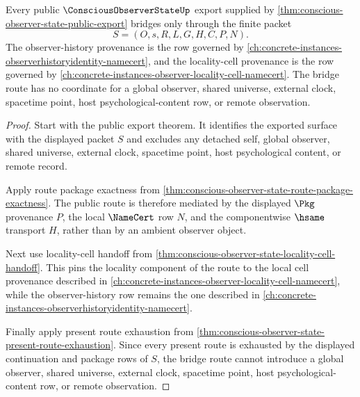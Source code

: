 \begin{theorem}
\label{thm:conscious-observer-state-bridge-route}
Every public $\ConsciousObserverStateUp$ export supplied by \autoref{thm:conscious-observer-state-public-export} bridges only through the finite packet
$$
S=(O,s,R,L,G,H,C,P,N).
$$
The observer-history provenance is the row governed by \autoref{ch:concrete-instances-observerhistoryidentity-namecert}, and the locality-cell provenance is the row governed by \autoref{ch:concrete-instances-observer-locality-cell-namecert}. The bridge route has no coordinate for a global observer, shared universe, external clock, spacetime point, host psychological-content row, or remote observation.
\end{theorem}
\begin{proof}
Start with the public export theorem. It identifies the exported surface with the displayed packet $S$ and excludes any detached self, global observer, shared universe, external clock, spacetime point, host psychological content, or remote record.

Apply route package exactness from \autoref{thm:conscious-observer-state-route-package-exactness}. The public route is therefore mediated by the displayed $\Pkg$ provenance $P$, the local $\NameCert$ row $N$, and the componentwise $\hsame$ transport $H$, rather than by an ambient observer object.

Next use locality-cell handoff from \autoref{thm:conscious-observer-state-locality-cell-handoff}. This pins the locality component of the route to the local cell provenance described in \autoref{ch:concrete-instances-observer-locality-cell-namecert}, while the observer-history row remains the one described in \autoref{ch:concrete-instances-observerhistoryidentity-namecert}.

Finally apply present route exhaustion from \autoref{thm:conscious-observer-state-present-route-exhaustion}. Since every present route is exhausted by the displayed continuation and package rows of $S$, the bridge route cannot introduce a global observer, shared universe, external clock, spacetime point, host psychological-content row, or remote observation.
\end{proof}


